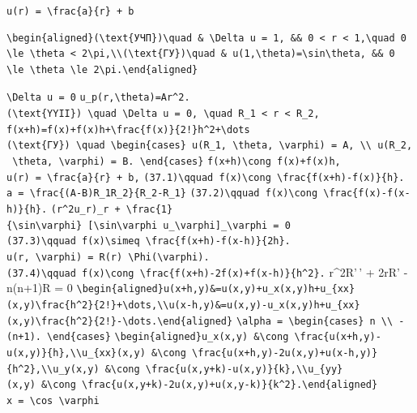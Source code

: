 \documentclass[
  ukrainian,
]{article}
\begin{document}
\texttt{u(r)\ =\ \textbackslash{}frac\{a\}\{r\}\ +\ b}

\begin{verbatim}
\begin{aligned}(\text{УЧП})\quad & \Delta u = 1, && 0 < r < 1,\quad 0 \le \theta < 2\pi,\\(\text{ГУ})\quad & u(1,\theta)=\sin\theta, && 0 \le \theta \le 2\pi.\end{aligned}
\end{verbatim}

\texttt{\textbackslash{}Delta\ u\ =\ 0}
\texttt{u\_p(r,\textbackslash{}theta)=Ar\^{}2.}
\texttt{(\textbackslash{}text\{YYII\})\ \textbackslash{}quad\ \textbackslash{}Delta\ u\ =\ 0,\ \textbackslash{}quad\ R\_1\ \textless{}\ r\ \textless{}\ R\_2,}
\texttt{f(x+h)=f(x)+f\textquotesingle{}(x)h+\textbackslash{}frac\{f\textquotesingle{}\textquotesingle{}(x)\}\{2!\}h\^{}2+\textbackslash{}dots}
\texttt{(\textbackslash{}text\{ГУ\})\ \textbackslash{}quad\ \textbackslash{}begin\{cases\}\ u(R\_1,\ \textbackslash{}theta,\ \textbackslash{}varphi)\ =\ A,\ \textbackslash{}\textbackslash{}\ u(R\_2,\ \textbackslash{}theta,\ \textbackslash{}varphi)\ =\ B.\ \textbackslash{}end\{cases\}}
\texttt{f(x+h)\textbackslash{}cong\ f(x)+f\textquotesingle{}(x)h,}
\texttt{u(r)\ =\ \textbackslash{}frac\{a\}\{r\}\ +\ b,}
\texttt{(37.1)\textbackslash{}qquad\ f\textquotesingle{}(x)\textbackslash{}cong\ \textbackslash{}frac\{f(x+h)-f(x)\}\{h\}.}
\texttt{a\ =\ \textbackslash{}frac\{(A-B)R\_1R\_2\}\{R\_2-R\_1\}}
\texttt{(37.2)\textbackslash{}qquad\ f\textquotesingle{}(x)\textbackslash{}cong\ \textbackslash{}frac\{f(x)-f(x-h)\}\{h\}.}
\texttt{(r\^{}2u\_r)\_r\ +\ \textbackslash{}frac\{1\}\{\textbackslash{}sin\textbackslash{}varphi\}\ {[}\textbackslash{}sin\textbackslash{}varphi\ u\_\textbackslash{}varphi{]}\_\textbackslash{}varphi\ =\ 0}
\texttt{(37.3)\textbackslash{}qquad\ f\textquotesingle{}(x)\textbackslash{}simeq\ \textbackslash{}frac\{f(x+h)-f(x-h)\}\{2h\}.}
\texttt{u(r,\ \textbackslash{}varphi)\ =\ R(r)\ \textbackslash{}Phi(\textbackslash{}varphi).}
\texttt{(37.4)\textbackslash{}qquad\ f\textquotesingle{}\textquotesingle{}(x)\textbackslash{}cong\ \textbackslash{}frac\{f(x+h)-2f(x)+f(x-h)\}\{h\^{}2\}.}
r\^{}2R'\,' + 2rR' - n(n+1)R = 0
\texttt{\textbackslash{}begin\{aligned\}u(x+h,y)\&=u(x,y)+u\_x(x,y)h+u\_\{xx\}(x,y)\textbackslash{}frac\{h\^{}2\}\{2!\}+\textbackslash{}dots,\textbackslash{}\textbackslash{}u(x-h,y)\&=u(x,y)-u\_x(x,y)h+u\_\{xx\}(x,y)\textbackslash{}frac\{h\^{}2\}\{2!\}-\textbackslash{}dots.\textbackslash{}end\{aligned\}}
\texttt{\textbackslash{}alpha\ =\ \textbackslash{}begin\{cases\}\ n\ \textbackslash{}\textbackslash{}\ -(n+1).\ \textbackslash{}end\{cases\}}
\texttt{\textbackslash{}begin\{aligned\}u\_x(x,y)\ \&\textbackslash{}cong\ \textbackslash{}frac\{u(x+h,y)-u(x,y)\}\{h\},\textbackslash{}\textbackslash{}u\_\{xx\}(x,y)\ \&\textbackslash{}cong\ \textbackslash{}frac\{u(x+h,y)-2u(x,y)+u(x-h,y)\}\{h\^{}2\},\textbackslash{}\textbackslash{}u\_y(x,y)\ \&\textbackslash{}cong\ \textbackslash{}frac\{u(x,y+k)-u(x,y)\}\{k\},\textbackslash{}\textbackslash{}u\_\{yy\}(x,y)\ \&\textbackslash{}cong\ \textbackslash{}frac\{u(x,y+k)-2u(x,y)+u(x,y-k)\}\{k\^{}2\}.\textbackslash{}end\{aligned\}}
\texttt{x\ =\ \textbackslash{}cos\ \textbackslash{}varphi}
\end{document}
